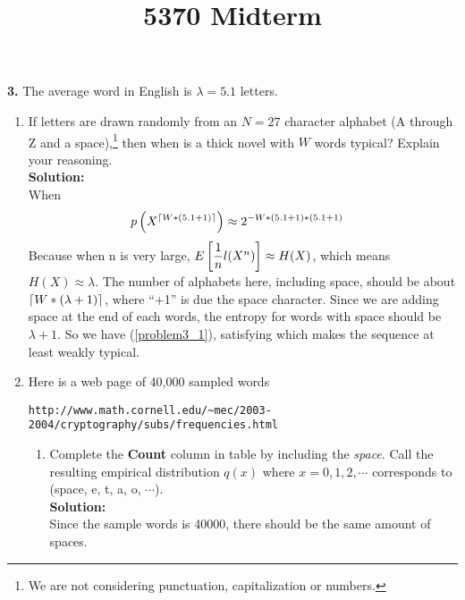 \documentclass{assignment}
\title{5370 Midterm}
\begin{document}
\textbf{3.}
\label{SquishyBear}
The average word in English is $\lambda =5.1$ letters.
\begin{enumerate}
\item  If letters are drawn randomly from an $N=27$ character alphabet (A through Z and a space),\footnote{
    We are not considering punctuation, capitalization or numbers.
  }
  then when is a thick novel with $W$ words typical? Explain your reasoning. \\

  \textbf{Solution:} \\
  When
  \begin{align}
    p\left(X^{\left \lceil W*(5.1 + 1) \right \rceil}\right) & \approx 2^{-W*(5.1 + 1)*(5.1 + 1)} \label{problem3_1}
  \end{align}
  Because when n is very large, $E\left[\dfrac{1}{n}l(X^n)\right] \approx H(X)$, which means $H(X) \approx \lambda$. The number of alphabets
  here, including space, should be about $\left \lceil W * (\lambda + 1) \right \rceil$, where ``+1'' is due the space character. Since
  we are adding space at the end of each words, the entropy for words with space should be $\lambda + 1$. So we have
  (\ref{problem3_1}), satisfying which makes the sequence at least weakly typical.

\item Here is a web page of 40,000 sampled words
  \begin{center}
    \verb"http://www.math.cornell.edu/~mec/2003-2004/cryptography/subs/frequencies.html"
  \end{center}
  \begin{enumerate}
  \item Complete the {\bf Count} column in table by including the {\em space}. Call the resulting empirical
    distribution $q(x)$ where $x=0,1,2,\cdots$ corresponds to (space, e, t, a, o, $\cdots$). \\
    \textbf{Solution:} \\
    Since the sample words is 40000, there should be the same amount of spaces.


\end{enumerate}
\end{enumerate}
\end{document}

